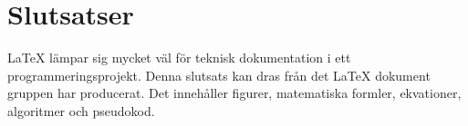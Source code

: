 \section{Slutsatser}
{\LaTeX} lämpar sig mycket väl för teknisk dokumentation i ett programmeringsprojekt. Denna slutsats kan dras från det {\LaTeX} dokument gruppen har producerat. Det innehåller figurer, matematiska formler, ekvationer, algoritmer och pseudokod. 
